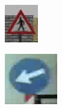 \begin{figure}[h]
  \centering
  \begin{subfigure}[b]{0.15\linewidth}
    \includegraphics[width=\linewidth]{figures/signs/CrossRoad.jpg}
    \caption{}
  \end{subfigure}
  \begin{subfigure}[b]{0.15\linewidth}
    \includegraphics[width=\linewidth]{figures/signs/KeepLeft.jpg}

\end{subfigure}
\end{figure}

